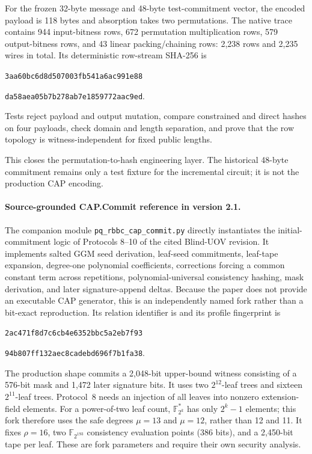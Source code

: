 \documentclass[11pt]{article}
\begin{document}
For the frozen 32-byte message and 48-byte test-commitment vector, the encoded
payload is 118 bytes and absorption takes two permutations.  The native trace
contains 944 input-bitness rows, 672 permutation multiplication rows, 579
output-bitness rows, and 43 linear packing/chaining rows: 2,238 rows and 2,235
wires in total.  Its deterministic row-stream SHA-256 is
\begin{center}
\texttt{3aa60bc6d8d507003fb541a6ac991e88}\par\vspace{-0.2em}
\texttt{da58aea05b7b278ab7e1859772aac9ed}.
\end{center}
Tests reject payload and output mutation, compare constrained and direct hashes
on four payloads, check domain and length separation, and prove that the row
topology is witness-independent for fixed public lengths.

This closes the permutation-to-hash engineering layer.  The historical
48-byte commitment remains only a test fixture for the incremental circuit; it
is not the production CAP encoding.

\paragraph{Source-grounded CAP.Commit reference in version 2.1.}
The companion module \texttt{pq\_rbbc\_cap\_commit.py} directly instantiates
the initial-commitment logic of Protocols 8--10 of the cited Blind-UOV
revision.  It implements salted GGM seed derivation, leaf-seed commitments,
leaf-tape expansion, degree-one polynomial coefficients, corrections forcing a
common constant term across repetitions, polynomial-universal consistency
hashing, mask derivation, and later signature-append deltas.  Because the paper
does not provide an executable CAP generator, this is an independently named
fork rather than a bit-exact reproduction.  Its relation identifier is
 and its profile fingerprint is
\begin{center}
\texttt{2ac471f8d7c6cb4e6352bbc5a2eb7f93}\par\vspace{-0.2em}
\texttt{94b807ff132aec8cadebd696f7b1fa38}.
\end{center}

The production shape commits a 2,048-bit upper-bound witness consisting of a
576-bit mask and 1,472 later signature bits.  It uses two $2^{12}$-leaf trees
and sixteen $2^{11}$-leaf trees.  Protocol~8 needs an injection of all leaves
into nonzero extension-field elements.  For a power-of-two leaf count,
$\mathbb F_{2^k}^{*}$ has only $2^k-1$ elements; this fork therefore uses the
safe degrees $\mu=13$ and $\mu=12$, rather than 12 and 11.  It fixes
$\rho=16$, two $\mathbb F_{2^{193}}$ consistency evaluation points (386 bits),
and a 2,450-bit tape per leaf.  These are fork parameters and require their own
security analysis.
\end{document}
